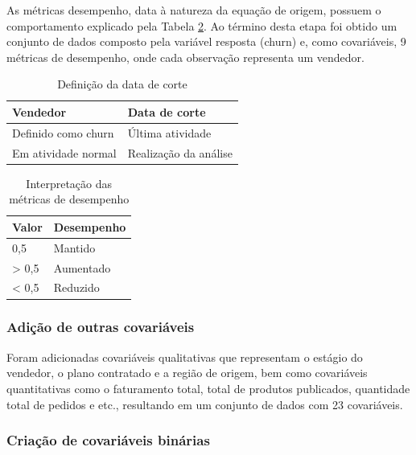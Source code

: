 \documentclass[twocolumn]{rbef}
\newcommand{\1}{\mathbbm{1}}
\begin{document}
As métricas desempenho, data à natureza da equação de origem, possuem o comportamento explicado pela Tabela \ref{tab:metricas}. Ao término desta etapa foi obtido um conjunto de dados composto pela variável resposta (churn) e, como covariáveis, 9 métricas de desempenho, onde cada observação representa um vendedor.

\begin{table}

\caption{\label{tab:dataDeCorte}Definição da data de corte}
\centering
\fontsize{9}{11}\selectfont
\begin{tabular}[t]{ll}
\toprule
Vendedor & Data de corte\\
\midrule
Definido como churn & Última atividade\\
Em atividade normal & Realização da análise\\
\bottomrule
\end{tabular}
\end{table}

\begin{table}

\caption{\label{tab:metricas}Interpretação das métricas de desempenho}
\centering
\fontsize{9}{11}\selectfont
\begin{tabular}[t]{ll}
\toprule
Valor & Desempenho\\
\midrule
0,5 & Mantido\\
> 0,5 & Aumentado\\
< 0,5 & Reduzido\\
\bottomrule
\end{tabular}
\end{table}

\hypertarget{adiuxe7uxe3o-de-outras-covariuxe1veis}{%
\subsubsection{Adição de outras covariáveis}\label{adiuxe7uxe3o-de-outras-covariuxe1veis}}

Foram adicionadas covariáveis qualitativas que representam o estágio do vendedor, o plano contratado e a região de origem, bem como covariáveis quantitativas como o faturamento total, total de produtos publicados, quantidade total de pedidos e etc., resultando em um conjunto de dados com 23 covariáveis.

\hypertarget{criauxe7uxe3o-de-covariuxe1veis-binuxe1rias}{%
\subsubsection{Criação de covariáveis binárias}\label{criauxe7uxe3o-de-covariuxe1veis-binuxe1rias}}
\end{document}
